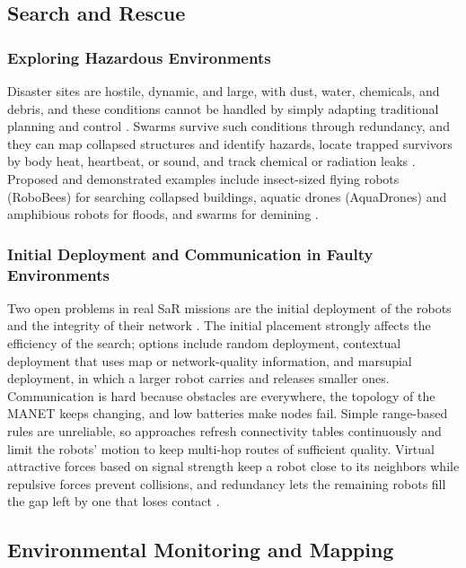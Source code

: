 \subsection{Search and Rescue}

\subsubsection{Exploring Hazardous Environments}

Disaster sites are hostile, dynamic, and large, with dust, water, chemicals, and
debris, and these conditions cannot be handled by simply adapting traditional
planning and control \cite{tan2016handbook}. Swarms survive such conditions
through redundancy, and they can map collapsed structures and identify hazards,
locate trapped survivors by body heat, heartbeat, or sound, and track chemical or
radiation leaks \cite{bhowmick2024bio}. Proposed and demonstrated examples
include insect-sized flying robots (RoboBees) for searching collapsed buildings,
aquatic drones (AquaDrones) and amphibious robots for floods, and swarms for
demining \cite{bhowmick2024bio}.

\subsubsection{Initial Deployment and Communication in Faulty Environments}

Two open problems in real SaR missions are the initial deployment of the robots
and the integrity of their network \cite{tan2016handbook}. The initial placement
strongly affects the efficiency of the search; options include random
deployment, contextual deployment that uses map or network-quality information,
and marsupial deployment, in which a larger robot carries and releases smaller
ones. Communication is hard because obstacles are everywhere, the topology of the
MANET keeps changing, and low batteries make nodes fail. Simple range-based rules
are unreliable, so approaches refresh connectivity tables continuously and limit
the robots' motion to keep multi-hop routes of sufficient quality. Virtual
attractive forces based on signal strength keep a robot close to its neighbors
while repulsive forces prevent collisions, and redundancy lets the remaining
robots fill the gap left by one that loses contact \cite{tan2016handbook}.

\subsection{Environmental Monitoring and Mapping}

